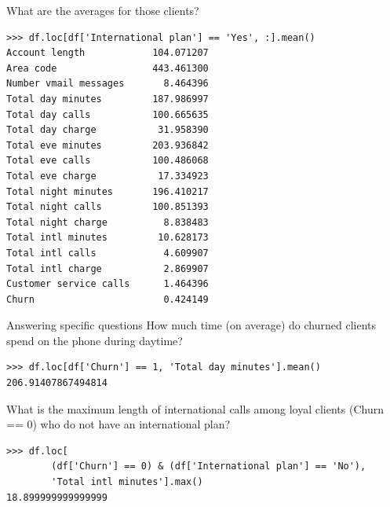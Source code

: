 \documentclass[aspectratio=169,usenames,dvipsnames]{beamer}
\begin{document}
\begin{frame}[fragile]{What are the averages for those clients?}
\vspace{-0.5em}
\begin{lstlisting}
>>> df.loc[df['International plan'] == 'Yes', :].mean()
Account length            104.071207
Area code                 443.461300
Number vmail messages       8.464396
Total day minutes         187.986997
Total day calls           100.665635
Total day charge           31.958390
Total eve minutes         203.936842
Total eve calls           100.486068
Total eve charge           17.334923
Total night minutes       196.410217
Total night calls         100.851393
Total night charge          8.838483
Total intl minutes         10.628173
Total intl calls            4.609907
Total intl charge           2.869907
Customer service calls      1.464396
Churn                       0.424149
\end{lstlisting}
\end{frame}

\begin{frame}[fragile]{Answering specific questions}
How much time (on average) do churned clients spend on the phone during daytime?

\begin{lstlisting}
>>> df.loc[df['Churn'] == 1, 'Total day minutes'].mean()
206.91407867494814
\end{lstlisting}

\pause
What is the maximum length of international calls among loyal clients
(Churn == 0) who do not have an international plan?

\begin{lstlisting}
>>> df.loc[
        (df['Churn'] == 0) & (df['International plan'] == 'No'),
        'Total intl minutes'].max()
18.899999999999999
\end{lstlisting}
\end{frame}



% 
% 
% 
 
\end{document}
